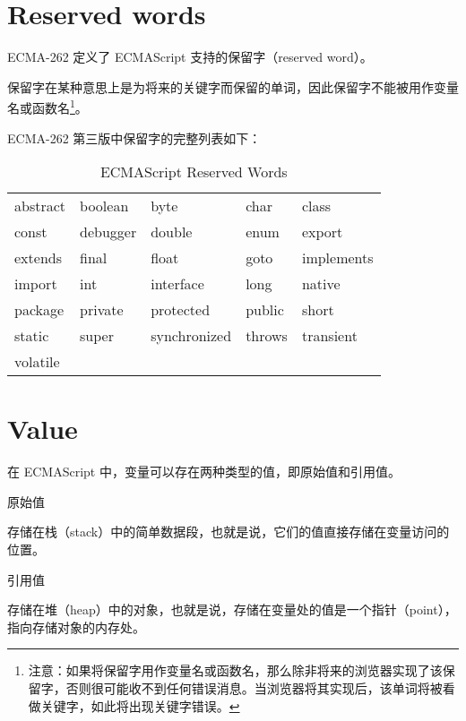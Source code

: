 \chapter{Reserved words}



ECMA-262 定义了 ECMAScript 支持的保留字（reserved word）。

保留字在某种意思上是为将来的关键字而保留的单词，因此保留字不能被用作变量名或函数名\footnote{注意：如果将保留字用作变量名或函数名，那么除非将来的浏览器实现了该保留字，否则很可能收不到任何错误消息。当浏览器将其实现后，该单词将被看做关键字，如此将出现关键字错误。}。

ECMA-262 第三版中保留字的完整列表如下：



\begin{table}[htbp]
\centering
\caption{ECMAScript Reserved Words}
\label{ecmascrpit_reserved_words}
\begin{tabular}{m{65pt}m{65pt}m{65pt}m{65pt}m{65pt}}
abstract	&boolean	&byte	&char	&class\\
const		&debugger	&double&enum	&export\\
extends		&final		&float	&goto	&implements\\
import		&int		&interface&long	&native\\
package		&private	&protected	&public&short\\
static		&super		&synchronized&throws&transient\\
volatile		&			&			&	&\\
\end{tabular}
\end{table}



\chapter{Value}
\vspace{-20pt}
在 ECMAScript 中，变量可以存在两种类型的值，即原始值和引用值。

\begin{compactitem}
\item 原始值

存储在栈（stack）中的简单数据段，也就是说，它们的值直接存储在变量访问的位置。

\item 引用值

存储在堆（heap）中的对象，也就是说，存储在变量处的值是一个指针（point），指向存储对象的内存处。

\end{compactitem}


